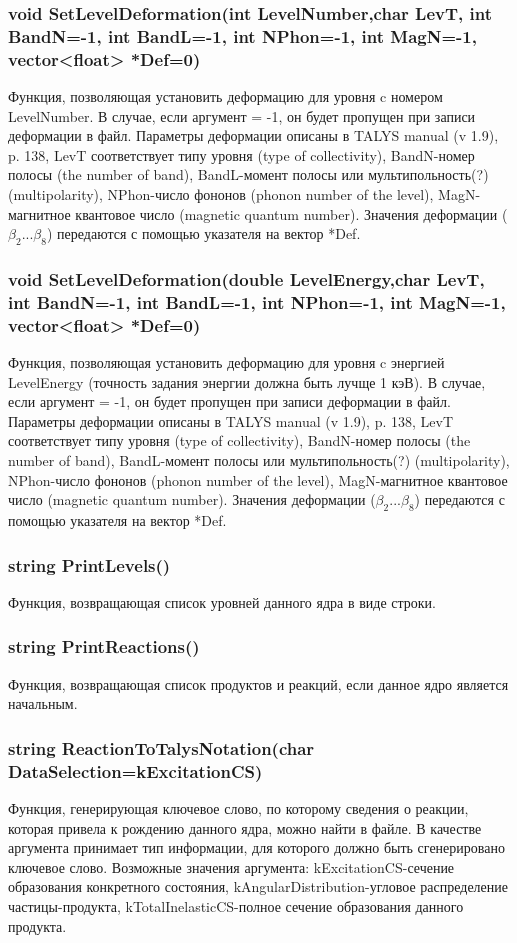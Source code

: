 \documentclass[a4paper,12pt]{extarticle}
\begin{document}
\subsubsection{void SetLevelDeformation(int LevelNumber,char LevT, int BandN=-1, int BandL=-1, int NPhon=-1, int MagN=-1, vector<float> *Def=0)}
Функция, позволяющая установить деформацию для уровня c номером LevelNumber. В случае, если аргумент = -1, он будет пропущен при записи деформации в файл. Параметры деформации описаны в TALYS manual (v 1.9), p. 138, LevT соответствует типу уровня (type of collectivity), BandN-номер полосы (the number of band), BandL-момент полосы или мультипольность(?) (multipolarity), NPhon-число фононов (phonon number of the level), MagN-магнитное квантовое число (magnetic quantum number). Значения деформации ($\beta_2...\beta_8$) передаются с помощью указателя на вектор *Def.
\subsubsection{void SetLevelDeformation(double LevelEnergy,char LevT, int BandN=-1, int BandL=-1, int NPhon=-1, int MagN=-1, vector<float> *Def=0)}
Функция, позволяющая установить деформацию для уровня c энергией LevelEnergy (точность задания энергии должна быть лучще 1 кэВ). В случае, если аргумент = -1, он будет пропущен при записи деформации в файл. Параметры деформации описаны в TALYS manual (v 1.9), p. 138, LevT соответствует типу уровня (type of collectivity), BandN-номер полосы (the number of band), BandL-момент полосы или мультипольность(?) (multipolarity), NPhon-число фононов (phonon number of the level), MagN-магнитное квантовое число (magnetic quantum number). Значения деформации ($\beta_2...\beta_8$) передаются с помощью указателя на вектор *Def.
\subsubsection{string PrintLevels()}
Функция, возвращающая список уровней данного ядра в виде строки.
\subsubsection{string PrintReactions()}
Функция, возвращающая список продуктов и реакций, если данное ядро является начальным.
\subsubsection{string ReactionToTalysNotation(char DataSelection=kExcitationCS)}
Функция, генерирующая ключевое слово, по которому сведения о реакции, которая привела к рождению данного ядра, можно найти в файле. В качестве аргумента принимает тип информации, для которого должно быть сгенерировано ключевое слово. Возможные значения аргумента: kExcitationCS-сечение образования конкретного состояния, kAngularDistribution-угловое распределение частицы-продукта, kTotalInelasticCS-полное сечение образования данного продукта.
\end{document}
